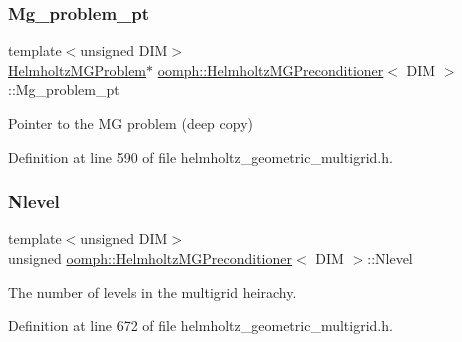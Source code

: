 \subsubsection{\texorpdfstring{Mg\+\_\+problem\+\_\+pt}{Mg\_problem\_pt}}
{\footnotesize\ttfamily template$<$unsigned D\+IM$>$ \\
\hyperlink{classoomph_1_1HelmholtzMGProblem}{Helmholtz\+M\+G\+Problem}$\ast$ \hyperlink{classoomph_1_1HelmholtzMGPreconditioner}{oomph\+::\+Helmholtz\+M\+G\+Preconditioner}$<$ D\+IM $>$\+::Mg\+\_\+problem\+\_\+pt\hspace{0.3cm}{\ttfamily [private]}}



Pointer to the MG problem (deep copy) 



Definition at line 590 of file helmholtz\+\_\+geometric\+\_\+multigrid.\+h.

\mbox{\label{classoomph_1_1HelmholtzMGPreconditioner_af9e0d8ee42dc6f596f384cbe0d9ce882}} 
\subsubsection{\texorpdfstring{Nlevel}{Nlevel}}
{\footnotesize\ttfamily template$<$unsigned D\+IM$>$ \\
unsigned \hyperlink{classoomph_1_1HelmholtzMGPreconditioner}{oomph\+::\+Helmholtz\+M\+G\+Preconditioner}$<$ D\+IM $>$\+::Nlevel\hspace{0.3cm}{\ttfamily [private]}}



The number of levels in the multigrid heirachy. 



Definition at line 672 of file helmholtz\+\_\+geometric\+\_\+multigrid.\+h.

\mbox{\label{classoomph_1_1HelmholtzMGPreconditioner_a752216736f7fcb37f8476cea03916b6e}} 

